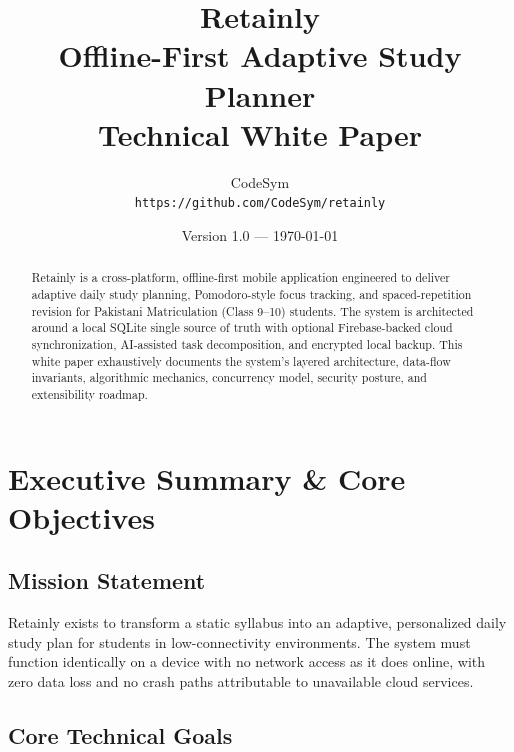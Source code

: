\documentclass[12pt,a4paper,openany]{report}
\title{
  \textbf{\Huge Retainly}\\[0.5em]
  \Large Offline-First Adaptive Study Planner\\[2em]
  \large Technical White Paper
}
\author{
  CodeSym\\
  \texttt{https://github.com/CodeSym/retainly}
}
\date{Version 1.0 --- \today}
\begin{document}
\maketitle
\thispagestyle{empty}
\newpage

\begin{abstract}
\noindent
Retainly is a cross-platform, offline-first mobile application engineered to deliver adaptive daily study planning, Pomodoro-style focus tracking, and spaced-repetition revision for Pakistani Matriculation (Class 9--10) students. The system is architected around a local SQLite single source of truth with optional Firebase-backed cloud synchronization, AI-assisted task decomposition, and encrypted local backup. This white paper exhaustively documents the system's layered architecture, data-flow invariants, algorithmic mechanics, concurrency model, security posture, and extensibility roadmap.
\end{abstract}

\newpage
\tableofcontents
\newpage

\chapter{Executive Summary \& Core Objectives}

\section{Mission Statement}

Retainly exists to transform a static syllabus into an adaptive, personalized daily study plan for students in low-connectivity environments. The system must function identically on a device with no network access as it does online, with zero data loss and no crash paths attributable to unavailable cloud services.

\section{Core Technical Goals}
\end{document}

